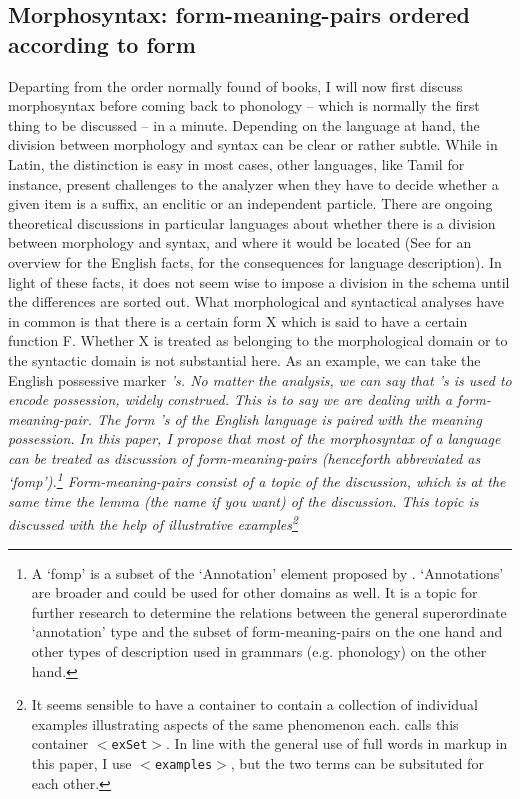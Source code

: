 \subsection{Morphosyntax: form-meaning-pairs ordered according to form}
Departing from the order normally found of books, I will now first discuss morphosyntax before coming back to phonology -- which is normally the first thing to be discussed -- in a minute. Depending on the language at hand, the division between morphology and syntax can be clear or rather subtle. While in Latin, the distinction is easy in most cases, other languages, like Tamil for instance, present challenges to the analyzer when they have to decide whether a given item is a suffix, an enclitic or an independent particle. There are ongoing theoretical discussions in particular languages about whether there is a division between morphology and syntax, and where it would be located (See \citet{CulicoverEtAl2005} for an overview for the English facts, \citet{Lehmann2002} for the consequences for language description). In light of these facts, it does not seem wise to impose a division in the schema until the differences are sorted out. What morphological and syntactical analyses have in common is that there is a certain form X which is said to have a certain function F. Whether X is treated as belonging to the morphological domain or to the syntactic domain is not substantial here. As an example, we can take the English possessive marker \em 's\em. No matter the analysis, we can say that \em 's \em is used to encode possession, widely construed. This is to say we are dealing with a \em form-meaning-pair\em.  The form \em 's \em of the English language is paired with the meaning \em possession\em. In this paper,  I propose that most of the morphosyntax of a language can be treated as discussion of form-meaning-pairs (henceforth abbreviated as `fomp').\footnote{A 
 `fomp' is a subset of the `Annotation' element proposed by \citet{Good2004}. `Annotations' are broader and could be used for other domains as well. It is a topic for further research to determine the relations between the general superordinate `annotation' type and the subset of form-meaning-pairs on the one hand and other types of description used in grammars (e.g. phonology)  on the other hand.
} 
Form-meaning-pairs consist of a topic of the discussion, which is at the same time the lemma (the name if you want) of the discussion. This topic is discussed with the help of illustrative examples\footnote{It
 seems sensible to have a container to contain a collection of individual examples illustrating aspects of the same phenomenon each. \citet{Good2004} calls this container \texttt{$<$exSet$>$}. In line with the general use of full words in markup in this paper, I use \texttt{$<$examples$>$}, but the two terms can be subsituted for each other.
} 
